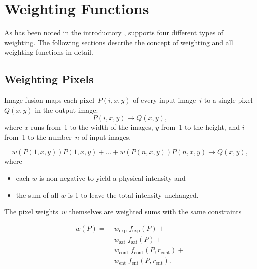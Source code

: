 

\chapter[Weighting Functions]{\label{sec:weighting-functions}%
  Weighting Functions}

As has been noted in the introductory , \App{} supports
four different types of weighting.  The following sections describe the concept of weighting and
all weighting functions in detail.


\section[Weighting Pixels]{\label{sec:weighting-pixels}%
  Weighting Pixels}

Image fusion maps each pixel~$P(i, x, y)$ of every input image~$i$ to a single pixel~$Q(x, y)$
in the output image:
\[
    P(i, x, y) \rightarrow Q(x, y),
\]
\noindent where $x$ runs from~1 to the width of the images, $y$ from~1 to the height, and $i$
from~1 to the number~$n$ of input images.

\begin{equation}
  \label{equ:weight}
  w(P(1, x, y)) P(1, x, y) + \ldots + w(P(n, x, y)) P(n, x, y)
  \rightarrow
  Q(x, y),
\end{equation}
\noindent where

\begin{itemize}
\item
  each $w$ is non-negative to yield a physical intensity and

\item
  the sum of all $w$ is 1 to leave the total intensity unchanged.
\end{itemize}

\noindent The pixel weights~$w$ themselves are weighted sums with the same constraints

\begin{align*}
    w(P) = \;
    & w_{\mathrm{exp}} \; f_{\mathrm{exp}}(P) + \\
    & w_{\mathrm{sat}} \; f_{\mathrm{sat}}(P) + \\
    & w_{\mathrm{cont}} \; f_{\mathrm{cont}}(P, r_{\mathrm{cont}}) + \\
    & w_{\mathrm{ent}} \; f_{\mathrm{ent}}(P, r_{\mathrm{ent}}).
\end{align*}

